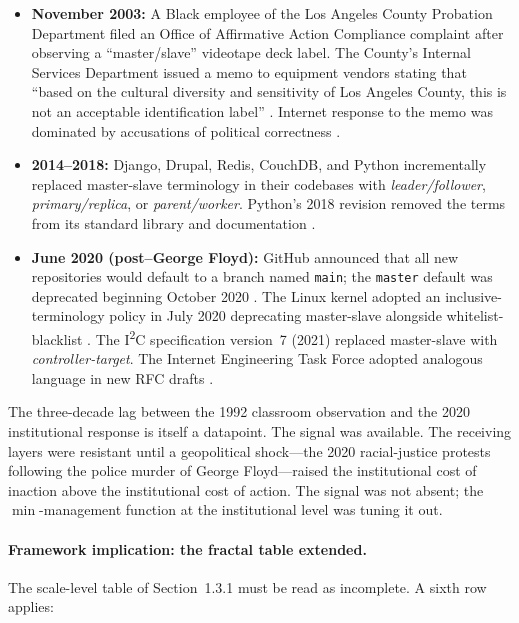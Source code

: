 \begin{itemize}[leftmargin=*]
    \item \textbf{November 2003:} A Black employee of the Los Angeles County Probation Department filed an Office of Affirmative Action Compliance complaint after observing a ``master/slave'' videotape deck label. The County's Internal Services Department issued a memo to equipment vendors stating that ``based on the cultural diversity and sensitivity of Los Angeles County, this is not an acceptable identification label'' \cite{lacounty_memo, cnn_lacounty}. Internet response to the memo was dominated by accusations of political correctness \cite{eglash_broken}.
    \item \textbf{2014--2018:} Django, Drupal, Redis, CouchDB, and Python incrementally replaced master-slave terminology in their codebases with \textit{leader/follower}, \textit{primary/replica}, or \textit{parent/worker}. Python's 2018 revision removed the terms from its standard library and documentation \cite{python_master_slave}.
    \item \textbf{June 2020 (post--George Floyd):} GitHub announced that all new repositories would default to a branch named \texttt{main}; the \texttt{master} default was deprecated beginning October 2020 \cite{github_main}. The Linux kernel adopted an inclusive-terminology policy in July 2020 deprecating master-slave alongside whitelist-blacklist \cite{linux_inclusive}. The I\textsuperscript{2}C specification version~7 (2021) replaced master-slave with \textit{controller-target}. The Internet Engineering Task Force adopted analogous language in new RFC drafts \cite{ietf_terminology}.
\end{itemize}

The three-decade lag between the 1992 classroom observation and the 2020 institutional response is itself a datapoint. The signal was available. The receiving layers were resistant until a geopolitical shock---the 2020 racial-justice protests following the police murder of George Floyd---raised the institutional cost of inaction above the institutional cost of action. The signal was not absent; the $\min$-management function at the institutional level was tuning it out.

\paragraph{Framework implication: the fractal table extended.}
The scale-level table of Section~1.3.1 must be read as incomplete. A sixth row applies:

